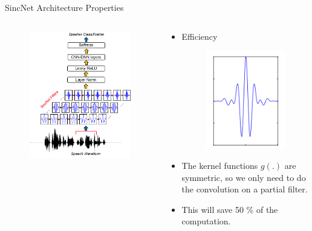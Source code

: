 \documentclass[notheorems, aspectratio=54]{beamer}
\begin{document}
\begin{frame}{SincNet Architecture Properties}
	\begin{columns}
		\begin{column}{0.47\textwidth}
			\begin{figure}[H]
				\includegraphics[width=0.9\linewidth]{images/SincNet.png}
			\end{figure}
		\end{column}
		\begin{column}{0.5\textwidth}
			\begin{itemize}
				\item Efficiency
				\begin{figure}[H]
					\includegraphics[width=0.45\linewidth]{images/g_symmetric.png}
				\end{figure}
				\item 	The kernel functions $g(.)$ are symmetric, so we only need to do the convolution on a partial filter.
				\item This will save 50 \% of the computation.
			\end{itemize}
		\end{column}
	\end{columns}
\end{frame}
\end{document}
